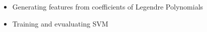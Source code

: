 \begin{itemize}
	\item Generating features from coefficients of Legendre Polynomials
	\item Training and evualuating SVM
\end{itemize}